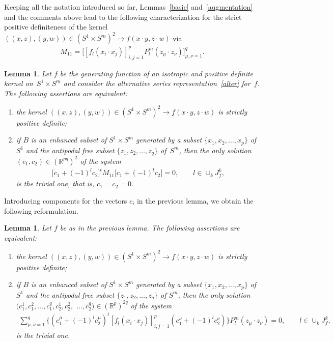 \documentclass[pdftex]{sigma}
\numberwithin{equation}{section}
\newtheorem{Lemma}[Theorem]{Lemma}
\begin{document}
Keeping all the notation introduced so far, Lemmas~\ref{basic} and~\ref{augmentation} and the comments above lead to the following characterization for the strict positive def\/initeness of the kernel $((x,z), (y,w)) \in (S^1 \times S^m)^2 \to f(x \cdot y, z \cdot w)$ via
\begin{gather*}M_{11}=\big[ [f_l(x_i \cdot x_j) ]_{i,j=1}^p P_l^m(z_\mu \cdot z_\nu)\big]_{\mu,\nu=1}^q.\end{gather*}
\begin{Lemma}
Let $f$ be the generating function of an isotropic and positive definite kernel on~\mbox{$S^1 \times S^m$} and consider the alternative series representation~\eqref{alter} for~$f$. The following assertions are equivalent:
\begin{enumerate}\itemsep=0pt
\item[$(i)$] the kernel $((x,z), (y,w)) \in (S^1 \times S^m)^2 \to f(x \cdot y, z \cdot w)$ is strictly positive definite;
\item[$(ii)$] if $B$ is an enhanced subset of $S^1 \times S^m$ generated by a subset $\{x_1,x_2, \ldots, x_p\}$ of~$S^1$ and the antipodal free subset $\{z_1, z_2,\ldots, z_q\}$ of~$S^m$, then the only solution $(c_1, c_2) \in (\mathbb{R}^{pq})^2$ of the system
\begin{gather*}\big[c_1+(-1)^l c_2\big]^tM_{11}\big[c_1+(-1)^lc_2\big]=0,\qquad l\in \cup_{k}J_f^k,\end{gather*}
is the trivial one, that is, $c_1=c_2=0$.
\end{enumerate}
\end{Lemma}

Introducing components for the vectors $c_i$ in the previous lemma, we obtain the following reformulation.

\begin{Lemma} \label{enhanced}
Let $f$ be as in the previous lemma. The following assertions are equivalent:
\begin{enumerate}\itemsep=0pt
\item[$(i)$] the kernel $((x,z), (y,w)) \in (S^1 \times S^m)^2 \to f(x \cdot y, z \cdot w)$ is strictly positive definite;
\item[$(ii)$] if $B$ is an enhanced subset of $S^1 \times S^m$ generated by a subset $\{x_1,x_2, \ldots, x_p\}$ of $S^1$ and the antipodal free subset $\{z_1, z_2,\ldots, z_q\}$ of $S^m$, then the only solution $(c_1^1, c_1^2, \ldots, c_1^q,c_2^1, c_2^2,$ $ \ldots, c_2^q) \in (\mathbb{R}^{p})^{2q}$ of the system
\begin{gather*}\sum_{\mu,\nu=1}^q \big\{(c_1^\mu+(-1)^l c_2^\mu)^t [f_l(x_i \cdot x_j) ]_{i,j=1}^p (c_1^\nu +(-1)^l c_2^\nu)\big\} P_l^m(z_\mu \cdot z_\nu)=0,\qquad l\in \cup_{k}J_f^k,
\end{gather*}
is the trivial one.
\end{enumerate}
\end{Lemma}
\end{document}
